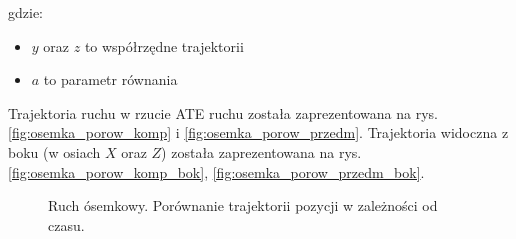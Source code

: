 gdzie:
\begin{itemize}
	\item $y$ oraz $z$ to współrzędne trajektorii
	\item $a$ to parametr równania
\end{itemize}

Trajektoria ruchu w rzucie ATE ruchu została zaprezentowana na rys. \ref{fig:osemka_porow_komp} i \ref{fig:osemka_porow_przedm}. Trajektoria widoczna z boku (w osiach $X$ oraz $Z$) została zaprezentowana na rys. \ref{fig:osemka_porow_komp_bok}, \ref{fig:osemka_porow_przedm_bok}.
\begin{figure}[H]
	\centering
	\hfill
	
	

	\caption{Ruch ósemkowy. Porównanie trajektorii pozycji w zależności od czasu.}
	\label{fig:osemka_a}

\end{figure}

